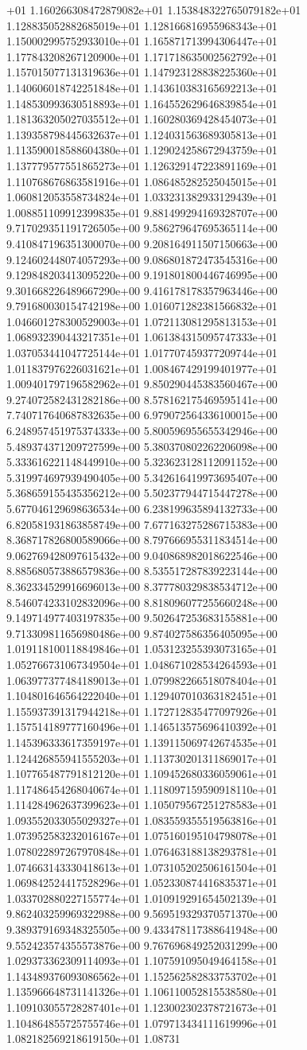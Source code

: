 +01	1.160266308472879082e+01	1.153848322765079182e+01	1.128835052882685019e+01	1.128166816955968343e+01	1.150002995752933010e+01	1.165871713994306447e+01	1.177843208267120900e+01	1.171718635002562792e+01	1.157015077131319636e+01	1.147923128838225360e+01	1.140606018742251848e+01	1.143610383165692213e+01	1.148530993630518893e+01	1.164552629646839854e+01	1.181363205027035512e+01	1.160280369428454073e+01	1.139358798445632637e+01	1.124031563689305813e+01	1.113590018588604380e+01	1.129024258672943759e+01	1.137779577551865273e+01	1.126329147223891169e+01	1.110768676863581916e+01	1.086485282525045015e+01	1.060812053558734824e+01	1.033231382933129439e+01	1.008851109912399835e+01	9.881499294169328707e+00	9.717029351191726505e+00	9.586279647695365114e+00	9.410847196351300070e+00	9.208164911507150663e+00	9.124602448074057293e+00	9.086801872473545316e+00	9.129848203413095220e+00	9.191801800446746995e+00	9.301668226489667290e+00	9.416178178357963446e+00	9.791680030154742198e+00	1.016071282381566832e+01	1.046601278300529003e+01	1.072113081295813153e+01	1.068932390443217351e+01	1.061384315095747333e+01	1.037053441047725144e+01	1.017707459377209744e+01	1.011837976226031621e+01	1.008467429199401977e+01	1.009401797196582962e+01	9.850290445383560467e+00	9.274072582431282186e+00	8.578162175469595141e+00	7.740717640687832635e+00	6.979072564336100015e+00	6.248957451975374333e+00	5.800596955655342946e+00	5.489374371209727599e+00	5.380370802262206098e+00	5.333616221148449910e+00	5.323623128112091152e+00	5.319974697939490405e+00	5.342616419973695407e+00	5.368659155435356212e+00	5.502377944715447278e+00	5.677046129698636534e+00	6.238199635894132733e+00	6.820581931863858749e+00	7.677163275286715383e+00	8.368717826800589066e+00	8.797666955311834514e+00	9.062769428097615432e+00	9.040868982018622546e+00	8.885680573886579836e+00	8.535517287839223144e+00	8.362334529916696013e+00	8.377780329838534712e+00	8.546074233102832096e+00	8.818096077255660248e+00	9.149714977403197835e+00	9.502647253683155881e+00	9.713309811656980486e+00	9.874027586356405095e+00	1.019118100118849846e+01	1.053123255393073165e+01	1.052766731067349504e+01	1.048671028534264593e+01	1.063977377484189013e+01	1.079982266518078404e+01	1.104801646564222040e+01	1.129407010363182451e+01	1.155937391317944218e+01	1.172712835477097926e+01	1.157514189777160496e+01	1.146513575696410392e+01	1.145396333617359197e+01	1.139115069742674535e+01	1.124426855941555203e+01	1.113730201311869017e+01	1.107765487791812120e+01	1.109452680336059061e+01	1.117486454268040674e+01	1.118097159590918110e+01	1.114284962637399623e+01	1.105079567251278583e+01	1.093552033055029327e+01	1.083559355519563816e+01	1.073952583232016167e+01	1.075160195104798078e+01	1.078022897267970848e+01	1.076463188138293781e+01	1.074663143330418613e+01	1.073105202506161504e+01	1.069842524417528296e+01	1.052330874416835371e+01	1.033702880227155774e+01	1.010919291654502139e+01	9.862403259969322988e+00	9.569519329370571370e+00	9.389379169348325505e+00	9.433478117388641948e+00	9.552423574355573876e+00	9.767696849252031299e+00	1.029373362309114093e+01	1.107591095049464158e+01	1.143489376093086562e+01	1.152562582833753702e+01	1.135966648731141326e+01	1.106110052815538580e+01	1.109103055728287401e+01	1.123002302378721673e+01	1.104864855725755746e+01	1.079713434111619996e+01	1.082182569218619150e+01	1.08731